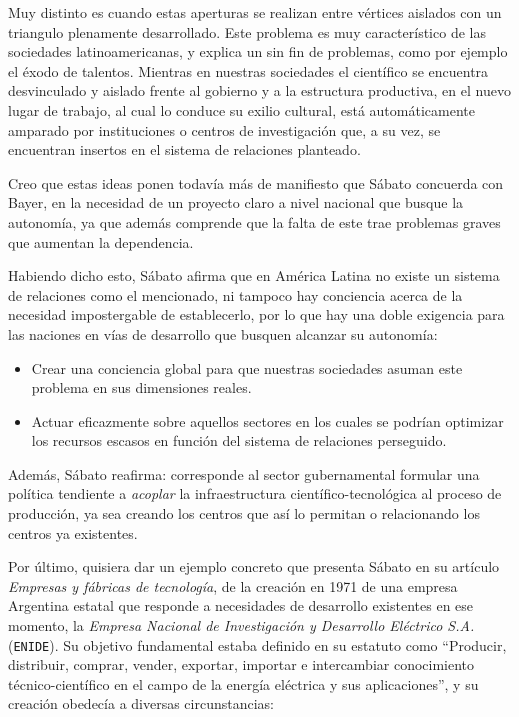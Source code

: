 Muy distinto es cuando estas aperturas se realizan entre vértices aislados con un triangulo plenamente desarrollado. Este problema es muy característico de las sociedades latinoamericanas, y explica un sin fin de problemas, como por ejemplo el éxodo de talentos. Mientras en nuestras sociedades el científico se encuentra desvinculado y aislado frente al gobierno y a la estructura productiva, en el nuevo lugar de trabajo, al cual lo conduce su exilio cultural, está automáticamente amparado por instituciones o centros de investigación que, a su vez, se encuentran insertos en el sistema de relaciones planteado.

Creo que estas ideas ponen todavía más de manifiesto que Sábato concuerda con Bayer, en la necesidad de un proyecto claro a nivel nacional que busque la autonomía, ya que además comprende que la falta de este trae problemas graves que aumentan la dependencia.

\vspace{0.5em}

Habiendo dicho esto, Sábato afirma que en América Latina no existe un sistema de relaciones como el mencionado, ni tampoco hay conciencia acerca de la necesidad impostergable de establecerlo, por lo que hay una doble exigencia para las naciones en vías de desarrollo que busquen alcanzar su autonomía:
\begin{itemize}
    \item Crear una conciencia global para que nuestras sociedades asuman este problema en sus dimensiones reales.
    \item Actuar eficazmente sobre aquellos sectores en los cuales se podrían optimizar los recursos escasos en función del sistema de relaciones perseguido.
\end{itemize}

Además, Sábato reafirma: corresponde al sector gubernamental formular una política tendiente a \textit{acoplar} la infraestructura científico-tecnológica al proceso de producción, ya sea creando los centros que así lo permitan o relacionando los centros ya existentes.

\vspace{0.5em}

Por último, quisiera dar un ejemplo concreto que presenta Sábato en su artículo \textit{Empresas y fábricas de tecnología}, de la creación en 1971 de una empresa Argentina estatal que responde a necesidades de desarrollo existentes en ese momento, la \textit{Empresa Nacional de Investigación y Desarrollo Eléctrico S.A.} (\texttt{ENIDE}). Su objetivo fundamental estaba definido en su estatuto como ``Producir, distribuir, comprar, vender, exportar, importar e intercambiar conocimiento técnico-científico en el campo de la energía eléctrica y sus aplicaciones'', y su creación obedecía a diversas circunstancias:

